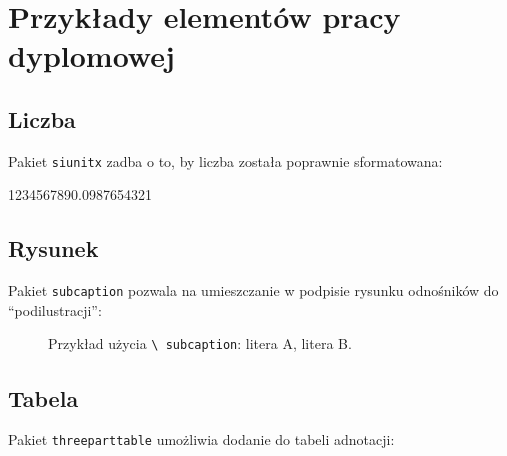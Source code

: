 \chapter{Przykłady elementów pracy dyplomowej}

\section{Liczba}

Pakiet \texttt{siunitx} zadba o to, by liczba została poprawnie sformatowana: \\
\begin{center}
        \num{1234567890.0987654321}
\end{center}


\section{Rysunek}

Pakiet \texttt{subcaption} pozwala na umieszczanie w podpisie rysunku odnośników do ``podilustracji'': \\

\begin{figure}[h]
        \centering
        \begin{subfigure}{0.35\textwidth}
                \centering
                \subcaption{\label{subfigure_a}}
        \end{subfigure}
        \begin{subfigure}{0.35\textwidth}
                \centering
                \subcaption{\label{subfigure_b}}
        \end{subfigure}\label{fig:subcaption_example}
	\caption{Przykład użycia \texttt{\textbackslash{} subcaption}: \protect{} litera A, \protect{} litera B.}
\end{figure}

\section{Tabela}

Pakiet \texttt{threeparttable} umożliwia dodanie do tabeli adnotacji: \\


